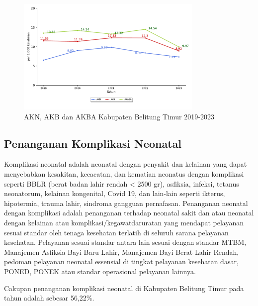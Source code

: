 \begin{figure}[H]
    \centering{}
    \includegraphics[width=0.8\textwidth]{bab_05/bab_05_11a_plotNeoBayiBalita}
    \caption{AKN, AKB dan AKBA Kabupaten Belitung Timur 2019-2023}
    \label{fig:AKN-AKB-AKBA-2019-2023}
\end{figure}

\subsection{Penanganan Komplikasi Neonatal}
Komplikasi neonatal adalah neonatal dengan penyakit dan kelainan yang
dapat menyebabkan kesakitan, kecacatan, dan kematian neonatus dengan
komplikasi seperti BBLR (berat badan lahir rendah < 2500 gr), asfiksia, infeksi, tetanus neonatorum, kelainan kongenital, Covid 19, dan lain-lain
seperti ikterus, hipotermia, trauma lahir, sindroma gangguan pernafasan. Penanganan neonatal dengan komplikasi adalah
penanganan terhadap neonatal sakit dan atau neonatal dengan kelainan
atau komplikasi/kegawatdaruratan yang mendapat pelayanan sesuai standar
oleh tenaga kesehatan terlatih di seluruh sarana pelayanan kesehatan.
Pelayanan sesuai standar antara lain sesuai dengan standar MTBM, Manajemen
Asfiksia Bayi Baru Lahir, Manajemen Bayi Berat Lahir Rendah, pedoman
pelayanan neonatal essensial di tingkat pelayanan kesehatan dasar,
PONED, PONEK atau standar operasional pelayanan lainnya.

Cakupan penanganan komplikasi neonatal di Kabupaten Belitung Timur
pada tahun \tP adalah sebesar 56,22\%.


